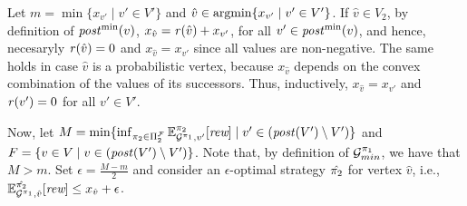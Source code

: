 \begin{myproof}
\begin{proofofclaim}
    Let $m = \min \{ x_{v'} \mid v' \in V' \}$ and
    $\hat{v} \in \operatorname*{argmin}  \{ x_{v'}  \mid v' \in V' \}$.
    If $\hat{v}\in V_2$, by definition of $\mathit{post}^{\min}(v)$,
    $x_{\hat{v}} = \mathit{r}(\hat{v}) + x_{v'}$, for all
    $v' \in \mathit{post}^{\min}(v)$, and hence, necesaryly $\mathit{r}(\hat{v})=0$
    and $x_{\hat{v}} = x_{v'}$ since all values are non-negative.
    The same holds in case $\hat{v}$ is a probabilistic vertex,
    because $x_{\hat{v}}$ depends on the convex combination of the
    values of its successors.
    Thus, inductively, $x_{\hat{v}} = x_{v'}$ and $\mathit{r}(v')=0$ for
    all $v'\in V'$.

    Now, let
    $M =  \min \{ \inf_{\pi_{2} \in \Pi^{\mathcal{F}}_{2}}  \mathbb{E}^{\pi_{2}}_{\mathcal{G}^{\pi_{1}},v'}[\textit{rew}] \mid v' \in (\mathit{post}(V') \setminus V')\}$
    and 
    $F=\{v \in V \mid v \in (\mathit{post}(V') \setminus V')\}$.
    Note that, by definition of $\mathcal{G}_{min}^{\pi_{1}}$, we have that $M > m$.
    Set $\epsilon = \frac{M -m}{2}$ and consider an $\epsilon$-optimal
    strategy $\hat{\pi_{2}}$ for vertex $\hat{v}$, i.e.,
    $\mathbb{E}^{\hat{\pi_{2}}}_{\mathcal{G}^{\pi_{1}},\hat{v}}[\textit{rew}] \leq x_{\hat{v}} + \epsilon$.
    

\end{proofofclaim}
\end{myproof}
